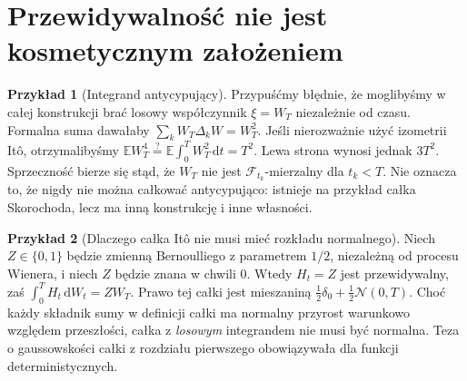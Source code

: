 \documentclass[11pt,a4paper,oneside]{report}
\numberwithin{equation}{chapter}
\theoremstyle{plain}
\theoremstyle{definition}
\newtheorem{przyklad}{Przykład}[chapter]
\theoremstyle{remark}
\newcommand{\E}{\mathbb{E}}
\newcommand{\calF}{\mathcal{F}}
\newcommand{\dd}{\mathrm{d}}
\newcommand{\Normal}{\mathcal{N}}
\begin{document}
\section{Przewidywalność nie jest kosmetycznym założeniem}
\begin{przyklad}[Integrand antycypujący]
Przypuśćmy błędnie, że moglibyśmy w całej konstrukcji
brać losowy współczynnik $\xi=W_T$ niezależnie od
czasu. Formalna suma dawałaby
$\sum_kW_T\Delta_kW=W_T^2$.
Jeśli nierozważnie użyć izometrii Itô, otrzymalibyśmy
$\E W_T^4\overset{?}=\E\int_0^TW_T^2\,\dd t=T^2$.
Lewa strona wynosi jednak $3T^2$.
Sprzeczność bierze się stąd, że $W_T$ nie jest
$\calF_{t_k}$-mierzalny dla $t_k<T$.
Nie oznacza to, że nigdy nie można całkować
antycypująco: istnieje na przykład całka Skorochoda,
lecz ma inną konstrukcję i inne własności.
\end{przyklad}

\begin{przyklad}[Dlaczego całka Itô nie musi mieć rozkładu normalnego]
Niech $Z\in\{0,1\}$ będzie zmienną Bernoulliego
z parametrem $1/2$, niezależną od procesu Wienera,
i niech $Z$ będzie znana w chwili $0$.
Wtedy $H_t=Z$ jest przewidywalny, zaś
$\int_0^TH_t\,\dd W_t=ZW_T$.
Prawo tej całki jest mieszaniną
$\frac12\delta_0+\frac12\Normal(0,T)$.
Choć każdy składnik sumy w definicji całki ma
normalny przyrost warunkowo względem przeszłości,
całka z \emph{losowym} integrandem nie musi być
normalna. Teza o gaussowskości całki z rozdziału
pierwszego obowiązywała dla funkcji deterministycznych.
\end{przyklad}


\end{document}
